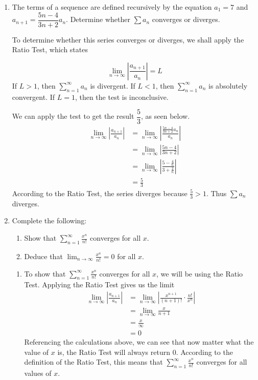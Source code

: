 \documentclass{article}
\begin{document}
\begin{enumerate}[label=\textbf{(12.\arabic*)}]
\newpage


\item The terms of a sequence are defined recursively by the equation $a_1=7$ and $a_{n+1}=\dfrac{5n-4}{3n+2}a_n$. Determine whether $\displaystyle \sum a_n$ converges or diverges. 

To determine whether this series converges or diverges, we shall apply the Ratio Test, which states
\begin{center}
\vspace{-20pt}
\[\lim_{n\to\infty}\left|\frac{a_{n+1}}{a_n}\right|=L\]
If $L>1$, then $\displaystyle \sum_{n=1}^\infty a_n$ is divergent.
If $L<1$, then $\displaystyle \sum_{n=1}^\infty a_n$ is absolutely convergent.
If $L=1$, then the test is inconclusive.
\end{center}
We can apply the test to get the result $\dfrac{5}{3}$, as seen below.
\begin{align*}
\lim_{n\to\infty} \left|\frac{a_{n+1}}{a_n}\right| &= \lim_{n\to\infty} \left|\frac{\frac{5n-4}{3n+2}a_n}{a_n}\right|\\
&= \lim_{n\to\infty} \left|\frac{5n-4}{3n+2}\right|\\
&= \lim_{n\to\infty} \left|\frac{5-\frac{4}{n}}{3+\frac{2}{n}}\right|\\
&= \frac{5}{3}
\end{align*}
According to the Ratio Test, the series diverges because $\frac{5}{3}>1$. Thus $\displaystyle \sum a_n$ diverges.

\newpage

\item Complete the following:
\begin{enumerate}
\item Show that $\displaystyle \sum_{n=1}^\infty \frac{x^n}{n!}$ converges for all $x$.
\item Deduce that $\displaystyle \lim_{n\to\infty} \frac{x^n}{n!}=0$ for all $x$.
\end{enumerate}

\begin{enumerate}
\item To show that $\displaystyle \sum_{n=1}^\infty \frac{x^n}{n!}$ converges for all $x$, we will be using the Ratio Test.	
Applying the Ratio Test gives us the limit
\begin{align*}
\lim_{n\to\infty} \left|\frac{a_{n+1}}{a_n}\right| &= \lim_{n\to\infty} \left|\frac{x^{n+1}}{(n+1)!}\cdot\frac{n!}{x^n}\right|\\
&= \lim_{n\to\infty} \frac{x}{n+1}\\
&= \frac{x}{\infty}\\
&= 0
\end{align*}
Referencing the calculations above, we can see that now matter what the value of $x$ is, the Ratio Test will always return $0$. According to the definition of the Ratio Test, this means that $\displaystyle \sum_{n=1}^\infty \frac{x^n}{n!}$ converges for all values of $x$.


\end{enumerate}
\end{enumerate}
\end{document}
